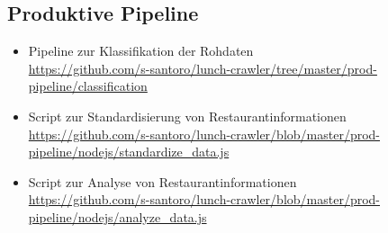 \subsection{Produktive Pipeline}
\label{app:prodpipeline}
\begin{itemize}
	\item Pipeline zur Klassifikation der Rohdaten\\ 
	\url{https://github.com/s-santoro/lunch-crawler/tree/master/prod-pipeline/classification}
	\item Script zur Standardisierung von Restaurantinformationen\\ 
	\url{https://github.com/s-santoro/lunch-crawler/blob/master/prod-pipeline/nodejs/standardize_data.js}
	\item Script zur Analyse von Restaurantinformationen\\ 
	\url{https://github.com/s-santoro/lunch-crawler/blob/master/prod-pipeline/nodejs/analyze_data.js}
\end{itemize} 


